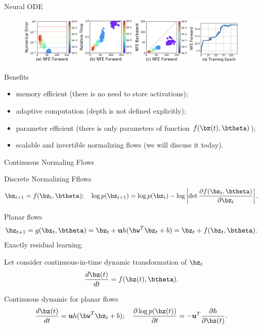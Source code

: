 \begin{frame}{Neural ODE}
	
	\begin{figure}
		\centering
		\includegraphics[width=\linewidth]{figs/neural_ode}
	\end{figure}
	
	\begin{block}{Benefits}
		\begin{itemize}
			\item memory efficient (there is no need to store activations);
			\item adaptive computation (depth is not defined explicitly);
			\item parameter efficient (there is only parameters of function $f(\bz(t), \btheta)$);
			\item scalable and invertible normalizing flows (we will discuss it today).
		\end{itemize}
	\end{block}

\end{frame}
\begin{frame}{Continuous Normaling Flows}
	\begin{block}{Discrete Normalizing Fflows}
		\vspace{-0.4cm}
		  \[
		  \bz_{t+1} = f(\bz_t, \btheta); \quad \log p(\bz_{t+1}) = \log p(\bz_{t}) - \log \left| \det \frac{\partial f(\bz_t, \btheta)}{\partial \bz_{t}} \right| .
		  \]
		\vspace{-0.4cm}
	\end{block}
	\begin{block}{Planar flows}
		\vspace{-0.3cm}
		\[
		\bz_{t + 1} = g(\bz_t, \btheta) = \bz_t + \mathbf{u} h(\bw^T\bz_t + b) = \bz_t + f(\bz_t, \btheta).
		\]
		Exactly residual learning.
	\end{block}
	Let consider continuous-in-time dynamic transformation of $\bz_t$
	\[
		\frac{d\bz(t)}{dt} = f(\bz(t), \btheta).
	\]
	\vspace{-0.3cm}
	\begin{block}{Continuous dynamic for planar flows}
		\vspace{-0.3cm}
		\[
			\frac{d\bz(t)}{dt}  = \mathbf{u} h(\bw^T\bz_t + b); \quad \frac{\partial \log p (\bz(t))}{ \partial t} = - \mathbf{u}^T \frac{\partial h}{\partial \bz(t)}.
		\]
	\end{block}

\end{frame}
